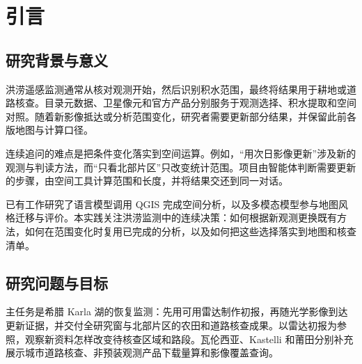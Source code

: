 {}
\begin{abstract}
洪灾恢复监测需要随新观测更新积水范围与核查清单。本项目实现 FloodLab 智能体，用开源框架 Pi 组织对话和工具调用，在本地完成影像下载、积水提取、证据比较与专题制图。主案例参照 Copernicus EMSN184 的希腊 Karla 湖监测任务：智能体先选用同轨 Sentinel-1 雷达影像制作 2023 年 12 月 18 日初报，再根据次日 Sentinel-2 的有效覆盖，改用光学水体指数 MNDWI。两期均检出 66.91 \km 候选积水，另有 28.52 \km 仅光学检出。第三轮复用两期证据图，分别生成全窗和北部的耕地与道路核查清单。全研究窗内，两期证据与耕地、道路中心线分别重叠约 60.93 \km 和 4.41 km。五份可编辑的地理信息系统工程均通过 QGIS 软件打开检查，面积与长度经独立程序复核。瓦伦西亚、Kastelli 和莆田补充展示道路核查、官方产品量算与目录覆盖检索。

\noindent\textbf{关键词：} AI for Science；洪涝遥感；多源证据；道路与耕地暴露；AI 智能体；QGIS
\end{abstract}

\section{引言}
\subsection{研究背景与意义}
洪涝遥感监测通常从核对观测开始，然后识别积水范围，最终将结果用于耕地或道路核查。目录元数据、卫星像元和官方产品分别服务于观测选择、积水提取和空间对照。随着新影像抵达或分析范围变化，研究者需要更新部分结果，并保留此前各版地图与计算口径。

连续追问的难点是把条件变化落实到空间运算。例如，“用次日影像更新”涉及新的观测与判读方法，而“只看北部片区”只改变统计范围。项目由智能体判断需要更新的步骤，由空间工具计算范围和长度，并将结果交还到同一对话。

已有工作研究了语言模型调用 QGIS 完成空间分析，以及多模态模型参与地图风格迁移与评价\cite{giscopilot,cartoagent}。本实践关注洪涝监测中的连续决策：如何根据新观测更换既有方法，如何在范围变化时复用已完成的分析，以及如何把这些选择落实到地图和核查清单。

\subsection{研究问题与目标}
主任务是希腊 Karla 湖的恢复监测：先用可用雷达制作初报，再随光学影像到达更新证据，并交付全研究窗与北部片区的农田和道路核查成果。以雷达初报为参照，观察新资料怎样改变待核查区域和路段。瓦伦西亚、Kastelli 和莆田分别补充展示城市道路核查、非预装观测产品下载量算和影像覆盖查询。

